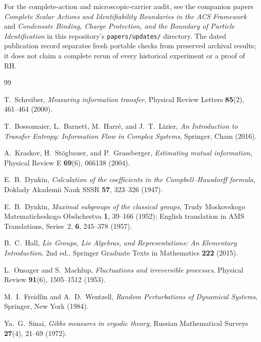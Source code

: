\documentclass[11pt,a4paper]{article}
\theoremstyle{plain}
\theoremstyle{definition}
\theoremstyle{remark}
\begin{document}
For the complete-action and microscopic-carrier audit, see the companion
papers \emph{Complete Scalar Actions and Identifiability Boundaries in the ACS
Framework} and \emph{Condensate Binding, Charge Protection, and the Boundary
of Particle Identification} in this repository's \texttt{papers/updates/}
directory. The dated publication record separates fresh portable checks
from preserved archival results; it does not claim a complete rerun of every
historical experiment or a proof of RH.

\begin{thebibliography}{99}

T.~Schreiber,
\textit{Measuring information transfer},
Physical Review Letters \textbf{85}(2), 461--464 (2000).

T.~Bossomaier, L.~Barnett, M.~Harr\'{e}, and J.~T.~Lizier,
\textit{An Introduction to Transfer Entropy: Information Flow in Complex Systems},
Springer, Cham (2016).

A.~Kraskov, H.~St\"{o}gbauer, and P.~Grassberger,
\textit{Estimating mutual information},
Physical Review E \textbf{69}(6), 066138 (2004).

E.~B.~Dynkin,
\textit{Calculation of the coefficients in the Campbell--Hausdorff formula},
Doklady Akademii Nauk SSSR \textbf{57}, 323--326 (1947).

E.~B.~Dynkin,
\textit{Maximal subgroups of the classical groups},
Trudy Moskovskogo Matematicheskogo Obshchestva \textbf{1}, 39--166 (1952);
English translation in AMS Translations, Series~2, \textbf{6}, 245--378 (1957).

B.~C.~Hall,
\textit{Lie Groups, Lie Algebras, and Representations: An Elementary Introduction},
2nd ed., Springer Graduate Texts in Mathematics \textbf{222} (2015).

L.~Onsager and S.~Machlup,
\textit{Fluctuations and irreversible processes},
Physical Review \textbf{91}(6), 1505--1512 (1953).

M.~I.~Freidlin and A.~D.~Wentzell,
\textit{Random Perturbations of Dynamical Systems},
Springer, New York (1984).

Ya.~G.~Sinai,
\textit{Gibbs measures in ergodic theory},
Russian Mathematical Surveys \textbf{27}(4), 21--69 (1972).


\end{thebibliography}
\end{document}
